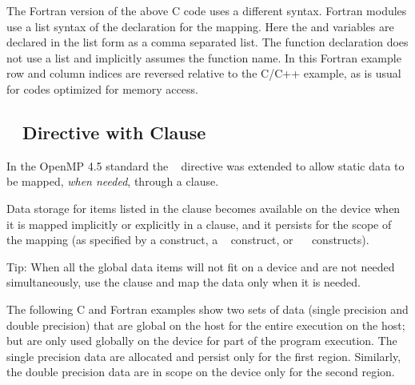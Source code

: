 The Fortran version of the above C code uses a different syntax. Fortran modules 
use a list syntax of the   declaration for the mapping. 
Here the  and  variables are declared in the list form as a comma separated list. 
The function declaration does not use a list and implicitly assumes the function 
name. In this Fortran example row and column indices are reversed relative to the 
C/C++ example, as is usual for codes optimized for memory access.



\subsection{~ Directive with  Clause}
\label{subsec:declare_target_link}

In the OpenMP 4.5 standard the ~ directive was extended to allow static
data to be mapped, \emph{when needed}, through a  clause.

Data storage for items listed in the  clause becomes available on the device
when it is mapped implicitly or explicitly in a  clause, and it persists for the scope of
the mapping (as specified by a  construct, 
a ~ construct, or 
~~ constructs).

Tip: When all the global data items will not fit on a device and are not needed
simultaneously, use the  clause and map the data only when it is needed.

The following C and Fortran examples show two sets of data (single precision and double precision)
that are global on the host for the entire execution on the host; but are only used
globally on the device for part of the program execution. The single precision data
are allocated and persist only for the first  region. Similarly, the
double precision data are in scope on the device only for the second  region.



